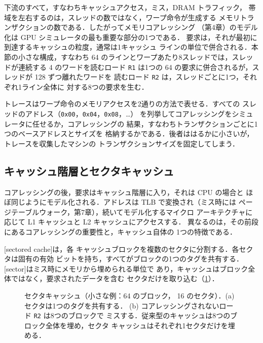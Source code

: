 \documentclass[../main.tex]{subfiles}
\begin{document}
下流のすべて，すなわちキャッシュアクセス，ミス，DRAM トラフィック，
帯域を左右するのは，スレッドの数ではなく，ワープ命令が生成する
メモリトランザクションの数である．したがってメモリコアレッシング
（第4章）のモデル化は GPU シミュレータの最も重要な部分の1つである．
要求は，それが最初に到達するキャッシュの粒度，通常は1キャッシュ
ラインの単位で併合される．本節の小さな構成，すなわち \SI{64}{\byte}
のラインとワープあたり8スレッドでは，スレッドが連続する
\SI{4}{\byte} のワードを読むロード \texttt{R1} は1つの \SI{64}{\byte}
の要求に併合されるが，スレッドが \SI{128}{\byte} ずつ離れたワードを
読むロード \texttt{R2} は，スレッドごとに1つ，それぞれ1ライン全体に
対する8つの要求を生む．

トレースはワープ命令のメモリアクセスを2通りの方法で表せる．すべての
スレッドのアドレス（\texttt{0x00}，\texttt{0x04}，\texttt{0x08}，\dots）
を列挙してコアレッシングをシミュレータに任せるか，コアレッシングの
結果，すなわちトランザクションごとに1つのベースアドレスとサイズを
格納するかである．後者ははるかに小さいが，トレースを収集したマシンの
トランザクションサイズを固定してしまう．

\subsection{キャッシュ階層とセクタキャッシュ}

コアレッシングの後，要求はキャッシュ階層に入り，それは CPU の場合と
ほぼ同じようにモデル化される．アドレスは TLB で変換され（ミス時には
ページテーブルウォーク，第7章），続いてモデル化するマイクロ
アーキテクチャに応じて L1 キャッシュと L2 キャッシュにアクセスする．
異なるのは，その前段にあるコアレッシングの重要性と，キャッシュ自体の
1つの特徴である．

\begin{definition}[セクタキャッシュ]
  \label{def:l08-sectored-cache}
  [sectored cache]は，各
  キャッシュブロックを複数のセクタに分割する．各セクタは固有の有効
  ビットを持ち，すべてがブロックの1つのタグを共有する．
  [sector]はミス時にメモリから埋められる単位で
  あり，キャッシュはブロック全体ではなく，要求されたデータを含む
  セクタだけを取り込む（\cref{fig:l08-sector-cache}）．
\end{definition}

\begin{figure}[tb]
  \centering
  
  \caption{セクタキャッシュ（小さな例：\SI{64}{\byte} のブロック，
    \SI{16}{\byte} のセクタ）．(a) セクタは1つのタグを共有する．
    (b) コアレッシングされないロード \texttt{R2} は8つのブロックで
    ミスする．従来型のキャッシュは8つのブロック全体を埋め，セクタ
    キャッシュはそれぞれ1セクタだけを埋める．}
  \label{fig:l08-sector-cache}
\end{figure}
\end{document}
